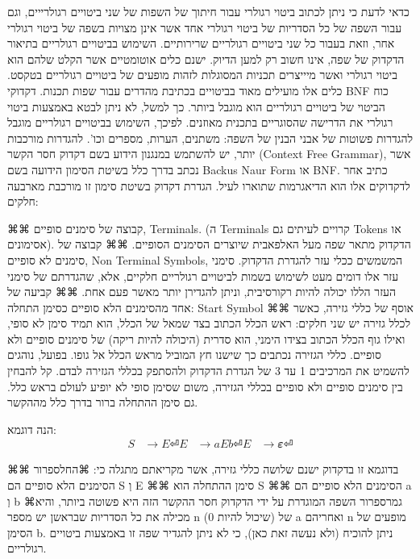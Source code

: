       כדאי לדעת כי ניתן לכתוב ביטוי רגולרי עבור חיתוך של השפות של שני ביטויים
      רגולרייים, וגם עבור השפה של כל הסדריות של ביטוי רגולרי אחד אשר אינן מצויות בשפה
      של ביטוי רגולרי אחר, וזאת בעבור כל שני ביטויים רגולריים שרירותיים. השימוש
      בביטויים רגולריים בתיאור הדקדוק של שפה, אינו חשוב רק למען הדיוק. ישנם כלים
      אוטומטיים אשר הקלט שלהם הוא ביטוי רגולרי ואשר מיייצרים תכניות המסוגלות לזהות
      מופעים של ביטויים רגולריים בטקסט. כלים אלו מועילים מאוד בביטויים בכתיבת מהדרים
      עבור שפות תכנות.
      דקדוקי BNF
      כוח הביטוי של ביטויים רגולריים הוא מוגבל ביותר. כך למשל, לא ניתן לבטא באמצעות
      ביטוי רגולרי את הדרישה שהסוגריים בתכנית מאוזנים. לפיכך, השימוש בביטויים
      רגולריים מוגבל להגדרות פשוטות של אבני הבנין של השפה: משתנים, הערות, מספרים
      וכו'. להגדרות מורכבות יותר, יש להשתמש במנגנון הידוע בשם דקדוק חסר הקשר
      (Context Free Grammar), אשר נכתב בדרך כלל בשיטת הסימון הידועה בשם Backus Naur
      Form או BNF. כתיב אחר לדקדוקים אלו הוא הדיאגרמות שתוארו לעיל.
      הגדרת דקדוק בשיטת סימון זו מורכבת מארבעה חלקים:
      \begin{enumerate}
      ⌘⌘ קבוצה של סימנים סופיים, Terminals. (ה Terminals קרויים
      לעיתים גם Tokens או אסימונים). הדקדוק מתאר שפה מעל האלפאבית
      שיוצרים הסימנים הסופיים.
      ⌘⌘ קבוצה של סימנים לא סופיים, Non Terminal Symbols, המשמשים
      ככלי עזר להגדרת הדקדוק. סימני עזר אלו דומים מעט לשימוש בשמות
      לביטויים רגולריים חלקיים, אלא, שהגדרתם של סימני העזר הללו
      יכולה להיות רקורסיבית, וניתן להגדירן יותר מאשר פעם אחת.
      ⌘⌘ קביעה של אחד מהסימנים הלא סופיים כסימן התחלה: Start Symbol
      ⌘⌘ אוסף של כללי גזירה, כאשר לכלל גזירה יש שני חלקים: ראש הכלל
      הכתוב בצד שמאל של הכלל, הוא תמיד סימן לא סופי, ואילו גוף הכלל
      הכתוב בצידו הימני, הוא סדרית (היכולה להיות ריקה) של סימנים
      סופיים ולא סופיים. כללי הגזירה נכתבים כך שישנו חץ המוביל מראש
      הכלל אל גופו. בפועל, נוהגים להשמיט את המרכיבים 1 עד 3 של
      הגדרת הדקדוק ולהסתפק בכללי הגזירה לבדם. קל להבחין בין סימנים
      סופיים ולא סופיים בכללי הגזירה, משום שסימן סופי לא יופיע
      לעולם בראש כלל. גם סימן ההתחלה ברור בדרך כלל מההקשר.
      \end{enumerate}
      הנה דוגמא:
      \begin{align}
        S &→E ⏎
        E &→a E b ⏎
        E &→𝜺 ⏎
      \end{align}

      בדוגמא זו בדקדוק ישנם שלושה כללי גזירה, אשר מקריאתם מתגלה כי:
   ⌘החל{ספרור}
      ⌘⌘ הסימנים הלא סופיים הם S וְ E
      ⌘⌘ סימן ההתחלה הוא S
      ⌘⌘ הסימנים הלא סופיים הם a וְ b
  ⌘גמר{ספרור}
      השפה המוגדרת על ידי הדקדוק חסר ההקשר הזה היא פשוטה ביותר, והיא מכילה את כל
      הסדריות שבראשן יש מספר n (שיכול להיות 0) של a ואחריהם n מופעים של הסימן b.
      ניתן להוכיח (ולא נעשה זאת כאן), כי לא ניתן להגדיר שפה זו באמצעות ביטויים
      רגולריים.

